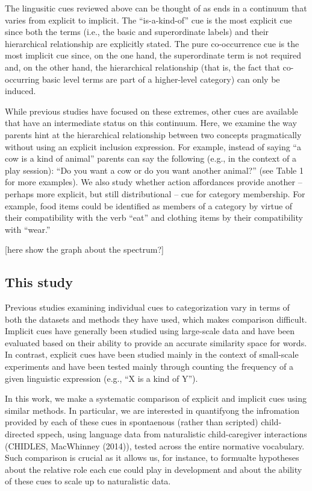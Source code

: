 \documentclass[english,,man,floatsintext]{apa6}
\begin{document}
The lingusitic cues reviewed above can be thought of as ends in a continuum that varies from explicit to implicit. The \enquote{is-a-kind-of} cue is the most explicit cue since both the terms (i.e., the basic and superordinate labels) and their hierarchical relationship are explicitly stated. The pure co-occurrence cue is the most implicit cue since, on the one hand,
the superordinate term is not required and, on the other hand, the hierarchical relationship (that is, the fact that co-occurring basic level terms are part of a higher-level category) can only be induced.

While previous studies have focused on these extremes, other cues are available that have an intermediate status on this continuum. Here, we examine the way parents hint at the hierarchical relationship between two concepts pragmatically without using an explicit inclusion expression. For example, instead of saying \enquote{a cow is a kind of animal} parents can say the following (e.g., in the context of a play session): \enquote{Do you want a cow or do you want another animal?} (see Table 1 for more examples). We also study whether action affordances provide another -- perhaps more explicit, but still distributional -- cue for category membership. For example, food items could be identified as members of a category by virtue of their compatibility with the verb \enquote{eat} and clothing items by their compatibility with \enquote{wear.}

{[}here show the graph about the spectrum?{]}

\hypertarget{this-study}{%
\subsection{This study}\label{this-study}}

Previous studies examining individual cues to categorization vary in terms of both the datasets and methods they have used, which makes comparison difficult. Implicit cues have
generally been studied using large-scale data and have been evaluated based on their ability to provide an accurate similarity space for words. In contrast, explicit cues have been studied mainly in the context of small-scale experiments and have been tested mainly through counting the frequency of a given linguistic expression (e.g., \enquote{X is a
kind of Y}).

In this work, we make a systematic comparison of explicit and implicit cues using similar methods. In particular, we are interested in quantifyong the infromation provided by each of these cues in spontaenous (rather than scripted) child-directed sppech, using language data from naturalistic child-caregiver interactions (CHIDLES, MacWhinney (2014)), tested across the entire normative vocabulary. Such comparison is crucial as it allows us, for instance, to formualte hypotheses about the relative role each cue could play in development and about the ability of these cues to scale up to naturalistic data.
\end{document}
